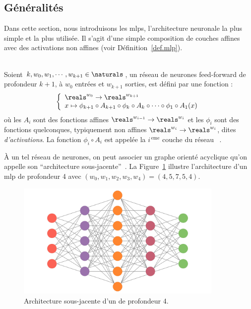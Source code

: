 \subsection{Généralités}

Dans cette section, nous introduisons les \glspl{mlp},
l'architecture neuronale la plus simple et la plus utilisée.
Il s'agit d'une simple composition de couches affines avec des activations non affines 
(voir Définition~\ref{def.mlp}).


\begin{definition}\ \\
    \label{def.mlp}
    Soient \(k, w_0, w_1, \cdots, w_{k+1}\in\naturals\), 
    un réseau de neurones feed-forward de profondeur \(k+1\), à \(w_0\) entrées et \(w_{k+1}\) sorties, 
    est défini par une fonction :
    \begin{equation}
        \label{eq.mlp}
        \left\{
        \begin{array}{l}
            \reals^{w_0} \to \reals^{w_{k+1}}\\
            x\mapsto
            \phi_{k+1} \circ A_{k+1} \circ \phi_k \circ A_k \circ \cdots \circ \phi_1 \circ A_1(x)
        \end{array}
        \right.
    \end{equation}
    où les \(A_i\) sont des fonctions affines \(\reals^{w_{i-1}}\to\reals^{w_i}\) 
    et les \(\phi_i\) sont des fonctions quelconques, typiquement non affines
    \(\reals^{w_i}\to\reals^{w_i}\), dites \emph{d'activations}.
    La fonction \(\phi_i\circ A_i\) est appelée la \(i^{\, \mathrm{eme}}\) couche du réseau%
    ~\cite{Mukherjee_2021}.
\end{definition}

À un tel réseau de neurones, on peut associer un graphe orienté acyclique 
qu'on appelle son ``architecture sous-jacente''~\cite{Kearns_Vazirani_1994}. 
La Figure~\ref{fig.mlp} illustre l'architecture d'un \gls{mlp} de profondeur 4
avec \({(w_0, w_1, w_2, w_3, w_4) = (4, 5, 7, 5, 4)}\).

\begin{figure}[hbt]
    \begin{center}
        \includegraphics[width=10cm]{assets/images/mlp.png}
    \end{center}
    \caption{Architecture sous-jacente d'un  de profondeur 4.}
    \label{fig.mlp}
\end{figure}

